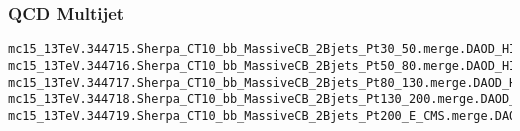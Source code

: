 \begin{scriptsize}
\subsubsection{QCD Multijet}
\begin{verbatim}
mc15_13TeV.344715.Sherpa_CT10_bb_MassiveCB_2Bjets_Pt30_50.merge.DAOD_HIGG5D2.e5681_a766_a821_r7676_p2949
mc15_13TeV.344716.Sherpa_CT10_bb_MassiveCB_2Bjets_Pt50_80.merge.DAOD_HIGG5D2.e5681_a766_a821_r7676_p2949
mc15_13TeV.344717.Sherpa_CT10_bb_MassiveCB_2Bjets_Pt80_130.merge.DAOD_HIGG5D2.e5681_a766_a821_r7676_p2949
mc15_13TeV.344718.Sherpa_CT10_bb_MassiveCB_2Bjets_Pt130_200.merge.DAOD_HIGG5D2.e5681_a766_a821_r7676_p2949
mc15_13TeV.344719.Sherpa_CT10_bb_MassiveCB_2Bjets_Pt200_E_CMS.merge.DAOD_HIGG5D2.e5681_a766_a821_r7676_p2949
\end{verbatim}


\end{scriptsize}
